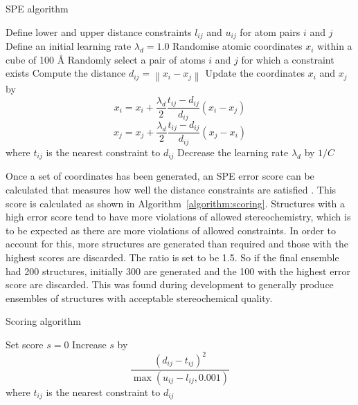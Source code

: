 \begin{algorithm}[p]
\caption{SPE algorithm}
\label{algorithm:spe}
\begin{algorithmic}

\State Define lower and upper distance constraints $l_{ij}$ and $u_{ij}$ for atom pairs $i$ and $j$
\State Define an initial learning rate $\lambda_{d} = 1.0$
\State Randomise atomic coordinates $x_{i}$ within a cube of 100 \AA
{}
        \State Randomly select a pair of atoms $i$ and $j$ for which a constraint exists
        \State Compute the distance $d_{ij} = \left\| x_{i} - x_{j} \right\|$
            \State Update the coordinates $x_{i}$ and $x_{j}$ by
                $$
                x_{i} = x_{i} + \frac{\lambda_{d}}{2} \frac{t_{ij} - d_{ij}}{d_{ij}} (x_{i} - x_{j})
                $$
                $$
                x_{j} = x_{j} + \frac{\lambda_{d}}{2} \frac{t_{ij} - d_{ij}}{d_{ij}} (x_{j} - x_{i})
                $$
            \State where $t_{ij}$ is the nearest constraint to $d_{ij}$
        \EndIf
    \EndFor
    \State Decrease the learning rate $\lambda_{d}$ by $1 / C$
\EndFor

\end{algorithmic}
\end{algorithm}


Once a set of coordinates has been generated, an SPE error score can be calculated that measures how well the distance constraints are satisfied \cite{Agrafiotis2013}.
This score is calculated as shown in Algorithm~\ref{algorithm:scoring}.
Structures with a high error score tend to have more violations of allowed stereochemistry, which is to be expected as there are more violations of allowed constraints.
In order to account for this, more structures are generated than required and those with the highest scores are discarded.
The ratio is set to be 1.5.
So if the final ensemble had 200 structures, initially 300 are generated and the 100 with the highest error score are discarded.
This was found during development to generally produce ensembles of structures with acceptable stereochemical quality.


\begin{algorithm}[p]
\caption{Scoring algorithm}
\label{algorithm:scoring}
\begin{algorithmic}

\State Set score $s = 0$
        \State Increase $s$ by
        $$
        \frac{(d_{ij} - t_{ij})^{2}}{\max \left ( u_{ij} - l_{ij}, 0.001 \right )}
        $$
        \State where $t_{ij}$ is the nearest constraint to $d_{ij}$
    \EndIf
\EndFor

\end{algorithmic}
\end{algorithm}


